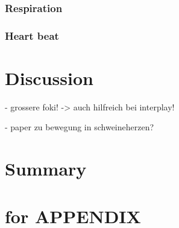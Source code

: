 \documentclass[type=dr, dr=rernat, accentcolor=tud7b,colorbacktitle, bigchapter, openright, twoside, 12pt ]{tudthesis}
\begin{document}
\subsubsection{Respiration}
\subsubsection{Heart beat}


\section{Discussion}

- grossere foki! -> auch hilfreich bei interplay!

- paper zu bewegung in schweineherzen?

\section{Summary}

\newpage

\section*{for APPENDIX}
\end{document}
